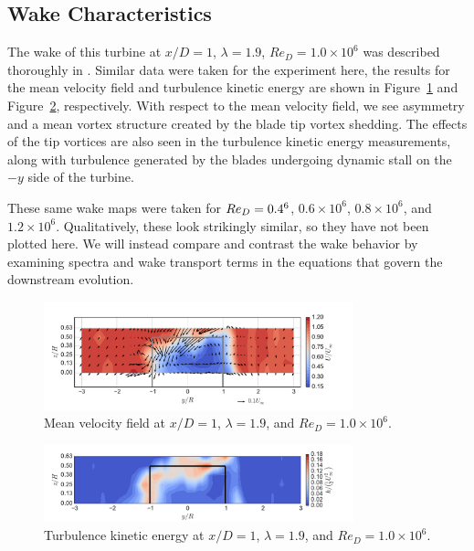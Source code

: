 \documentclass[energies,article,accept,moreauthors,pdftex,12pt,a4paper]{mdpi}
\begin{document}
\subsection{Wake Characteristics}

The wake of this turbine at $x/D=1$, $\lambda=1.9$, $Re_D = 1.0 \times 10^6$ was
described thoroughly in \cite{Bachant2015-JoT}. Similar data were taken for the
experiment here, the results for the mean velocity field and turbulence kinetic
energy are shown in Figure~\ref{fig:meancontquiv} and Figure~\ref{fig:kcont},
respectively. With respect to the mean velocity field, we see asymmetry and a
mean vortex structure created by the blade tip vortex shedding. The effects of
the tip vortices are also seen in the turbulence kinetic energy measurements,
along with turbulence generated by the blades undergoing dynamic stall on the
$-y$ side of the turbine.

These same wake maps were taken for $Re_D = 0.4 \time 10^6$, $0.6 \times 10^6$,
$0.8 \times 10^6$, and $1.2 \times 10^6$. Qualitatively, these look strikingly
similar, so they have not been plotted here. We will instead compare and
contrast the wake behavior by examining spectra and wake transport terms in the
equations that govern the downstream evolution.

\begin{figure}[ht!]
\centering
\includegraphics[width=0.8\textwidth]{figures/meancontquiv_10}
\caption{Mean velocity field at $x/D=1$, $\lambda=1.9$, and $Re_D=1.0 \times 10^6$.}
\label{fig:meancontquiv}
\end{figure}

\begin{figure}[ht!]
\centering
\includegraphics[width=0.8\textwidth]{figures/k_contours_10}
\caption{Turbulence kinetic energy at $x/D=1$, $\lambda=1.9$, and 
$Re_D=1.0 \times 10^6$.}
\label{fig:kcont}
\end{figure}
\end{document}
